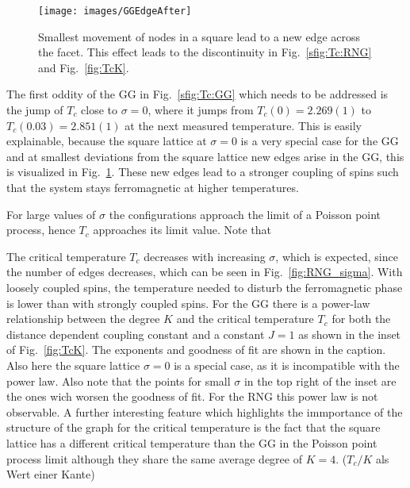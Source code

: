 \begin{figure}[hbtp]
    \texttt{[image: images/GGEdgeAfter]}
    \caption
    {
        Smallest movement of nodes in a square lead to a new edge across the
        facet. This effect leads to the discontinuity in Fig.~\ref{sfig:Tc:RNG} and
        Fig.~\ref{fig:TcK}.
    }
    \label{fig:GGEdgeAfter}
\end{figure}
The first oddity of the GG in Fig.~\ref{sfig:Tc:GG} which needs to be addressed is
the jump of $T_c$ close to $\sigma = 0$, where it jumps from $T_c(0) = 2.269(1)$
to $T_c(0.03) = 2.851(1)$ at the next measured temperature. This is easily explainable,
because the square lattice at $\sigma = 0$ is a very special case for the
GG and at smallest deviations from the square lattice new edges arise in
the GG, this is visualized in Fig.~\ref{fig:GGEdgeAfter}. These new edges lead
to a stronger coupling of spins such that the system stays ferromagnetic at
higher temperatures.

For large values of $\sigma$ the configurations approach the limit of a
Poisson point process, hence $T_c$ approaches its limit value. Note that

The critical temperature $T_c$ decreases with increasing $\sigma$, which
is expected, since the number of edges decreases, which can be seen in
Fig.~\ref{fig:RNG_sigma}. With loosely coupled spins, the temperature
needed to disturb the ferromagnetic phase is lower than with strongly coupled
spins.
For the GG there is a power-law relationship between the degree $K$ and
the critical temperature $T_c$ for both the distance dependent coupling constant
and a constant $J=1$ as shown in the inset of Fig.~\ref{fig:TcK}. The exponents
and goodness of fit are shown in the caption.
Also here the square lattice $\sigma = 0$ is a special case, as it is incompatible with the
power law. Also note that the points for small $\sigma$ in the top right of the
inset are the ones wich worsen the goodness of fit. For the RNG this power law
is not observable.
A further interesting feature which highlights the immportance of the structure
of the graph for the critical temperature is the fact that the square lattice
has a different critical temperature than the GG in the Poisson point process
limit although they share the same average degree of $K=4$. ($T_c/K$ als Wert einer Kante)
